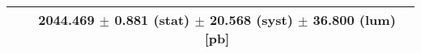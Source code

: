 \begin{tabular}{lc}
\hline
                               & 2044.469 $\pm$ 0.881 (stat) $\pm$ 20.568 (syst) $\pm$ 36.800 (lum) [pb]  \\
\hline
\end{tabular}
